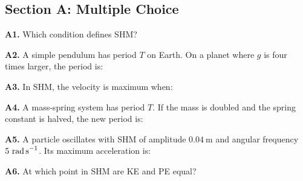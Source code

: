 \newpage
\begin{exercisebox}[7]

\subsection*{Section A: Multiple Choice}

\textbf{A1.} Which condition defines SHM?


\vspace{0.4cm}

\textbf{A2.} A simple pendulum has period $T$ on Earth.
On a planet where $g$ is four times larger, the period is:


\vspace{0.4cm}

\textbf{A3.} In SHM, the velocity is maximum when:


\vspace{0.4cm}

\textbf{A4.} A mass-spring system has period $T$.
If the mass is doubled and the spring constant is
halved, the new period is:


\vspace{0.4cm}

\textbf{A5.} A particle oscillates with SHM of
amplitude $0.04\ \text{m}$ and angular frequency
$5\ \text{rad\,s}^{-1}$. Its maximum acceleration is:


\vspace{0.4cm}

\textbf{A6.} At which point in SHM are KE and PE equal?


\end{exercisebox}
